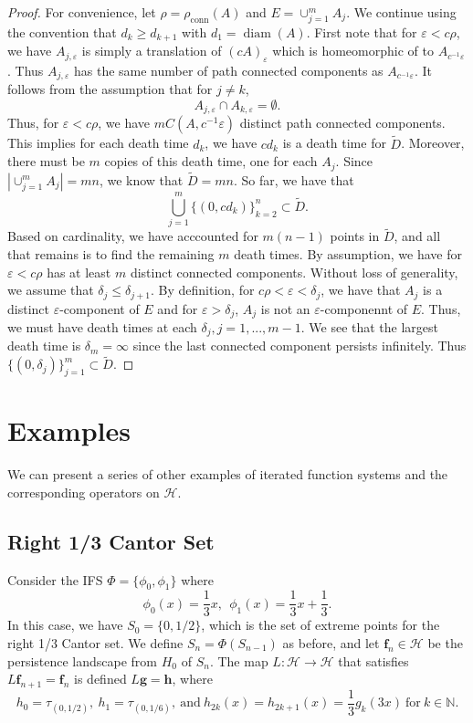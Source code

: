 \documentclass [52pt] {article}
\newcommand{\N}{\mathbb{N}}
\newcommand{\Hil}{\mathcal{H}}
\DeclareMathOperator{\diam}{diam}
\begin{document}
\begin{proof}
For convenience, let $\rho = \rho_{\mathrm{conn}}(A)$ and $E = \cup_{j=1}^m A_j$.  We continue using the convention that $d_k\ge d_{k+1}$ with $d_1 = \diam(A)$.  First note that for $\varepsilon<c\rho$, we have $A_{j,\varepsilon}$ is simply a translation of $(cA)_\varepsilon$ which is homeomorphic of to $A_{c^{-1}\varepsilon}$.  Thus $A_{j,\varepsilon}$ has the same number of path connected components as $A_{c^{-1}\varepsilon}$.  It follows from the assumption that for $j\not = k$,
\[A_{j,\varepsilon}\cap A_{k,\varepsilon} = \emptyset.\]
Thus, for $\varepsilon < c\rho$, we have $mC(A,c^{-1}\varepsilon)$ distinct path connected components.  This implies for each death time $d_k$, we have $cd_k$ is a death time for $\tilde{D}$. Moreover, there must be $m$ copies of this death time, one for each $A_j$.  Since $\left| \cup_{j=1}^m A_j\right| = mn$, we know that $\tilde{D} = mn$.  So far, we have that 
\[\bigcup_{j=1}^m \{(0,cd_k)\}_{k=2}^n\subset \tilde{D}.\]
Based on cardinality, we have acccounted for $m(n-1)$ points in $\tilde{D}$, and all that remains is to find the remaining $m$ death times.  By assumption, we have for $\varepsilon<c\rho$ has at least $m$ distinct connected components.  Without loss of generality, we assume that $\delta_j\le \delta_{j+1}$.  By definition, for $c\rho <\varepsilon <\delta_j$, we have that $A_j$ is a distinct $\varepsilon$-component of $E$ and for $\varepsilon >\delta_j$, $A_j$ is not an $\varepsilon$-componennt of $E$.  Thus, we must have death times at each $\delta_j, j = 1,...,m-1$.  We see that the largest death time is $\delta_m = \infty$ since the last connected component persists infinitely.  Thus $\{(0,\delta_j)\}_{j=1}^m\subset \tilde{D}$.
\end{proof}


\section{Examples}
We can present a series of other examples of iterated function systems and the corresponding operators on $\mathcal{H}$. 
\subsection{Right 1/3 Cantor Set}
Consider the IFS $\Phi = \{\phi_0,\phi_1\}$ where
\[\phi_0(x) = \frac{1}{3}x,\:\:\phi_1(x) = \frac{1}{3}x+\frac{1}{3}.\]
In this case, we have $S_0 = \{0,1/2\}$, which is the set of extreme points for the right 1/3 Cantor set.  We define $S_n = \Phi(S_{n-1})$ as before, and let $\mathbf{f}_n\in\Hil$ be the persistence landscape from $H_0$ of $S_n$.  The map $L:\Hil\to\Hil$ that satisfies $L\mathbf{f}_{n+1} = \mathbf{f}_n$ is defined $L\mathbf{g} = \mathbf{h}$, where
\[h_0= \tau_{(0,1/2)},\: h_1 = \tau_{(0,1/6)},\:\text{and}\: h_{2k}(x) = h_{2k+1}(x) = \frac{1}{3}g_k(3x)\:\text{for}\: k\in\N.\]
\end{document}
